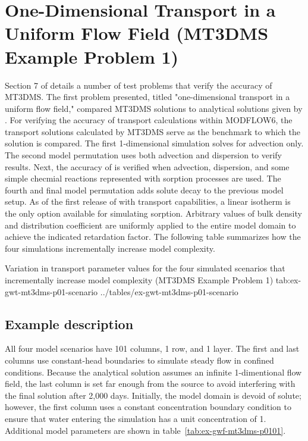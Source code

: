 \section{One-Dimensional Transport in a Uniform Flow Field (MT3DMS Example Problem 1)}

Section 7 of \cite{zheng1999mt3dms} details a number of test problems that verify the accuracy of MT3DMS.  The first problem presented, titled "one-dimensional transport in a uniform flow field," compared MT3DMS solutions to analytical solutions given by \cite{vanGenuchtenAlves1982}.  For verifying the accuracy of transport calculations within MODFLOW6, the transport solutions calculated by MT3DMS serve as the benchmark to which the \mf solution is compared.  The first 1-dimensional simulation solves for advection only.  The second model permutation uses both advection and dispersion to verify \mf results.  Next, the accuracy of \mf is verified when advection, dispersion, and some simple checmial reactions represented with sorption processes are used.  The fourth and final model permutation adds solute decay to the previous model setup. As of the first release of \mf with transport capabilities, a linear isotherm is the only option available for simulating sorption. Arbitrary values of bulk density and distribution coefficient are uniformly applied to the entire model domain to achieve the indicated retardation factor. The following table summarizes how the four simulations incrementally increase model complexity.

\begin{ScenarioTable}{
                                    Variation in transport parameter values for the four simulated scenarios that incrementally increase model complexity (MT3DMS Example Problem 1)}
                                     {tab:ex-gwt-mt3dms-p01-scenario}
                                     {../tables/ex-gwt-mt3dms-p01-scenario}
\end{ScenarioTable}

\subsection{Example description}

All four model scenarios have 101 columns, 1 row, and 1 layer. The first and last columns use constant-head boundaries to simulate steady flow in confined conditions. Because the analytical solution assumes an infinite 1-dimentional flow field, the last column is set far enough from the source to avoid interfering with the final solution after 2,000 days. Initially, the model domain is devoid of solute; however, the first column uses a constant concentration boundary condition to ensure that water entering the simulation has a unit concentration of 1. Additional model parameters are shown in table~\ref{tab:ex-gwf-mt3dms-p0101}.

